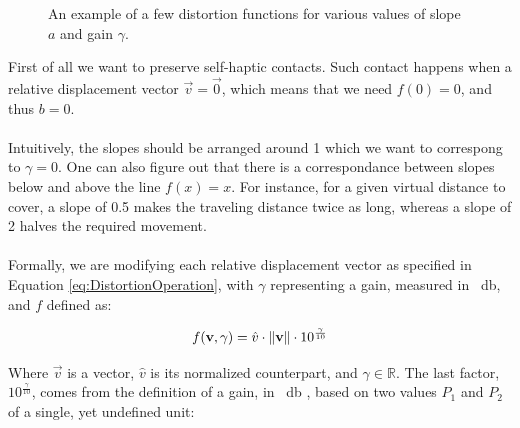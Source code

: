 \begin{figure}[h]
    \caption{An example of a few distortion functions for various values of slope $a$ and gain $\gamma $.}\label{fig:plotsOfGamma}
\end{figure}

\noindent
First of all we want to preserve self-haptic contacts. Such contact happens when a relative displacement vector $\vec{v} = \vec{0}$, which means that we need $f(0) = 0$, and thus $b = 0$.
\\\\
Intuitively, the slopes should be arranged around 1 which we want to correspong to $\gamma = 0$. One can also figure out that there is a correspondance between slopes below and above the line $f(x) = x$. For instance, for a given virtual distance to cover, a slope of \num{0.5} makes the traveling distance twice as long, whereas a slope of \num{2} halves the required movement.
\\\\
Formally, we are modifying each relative displacement vector as specified in Equation \ref{eq:DistortionOperation}, with $\gamma$ representing a gain, measured in \SI{}{\decibel}, and $f$ defined as:

\begin{equation}
\label{eq:DistortionFunction}
f(\mathbf{v},\gamma ) = \hat{v} \cdot \lVert\mathbf{v}\rVert \cdot 10^{\frac{\gamma}{10}}
\end{equation}

\noindent
Where $\vec{v}$ is a vector, $\hat{v}$ is its normalized counterpart, and $\gamma \in \mathbb{R}$. The last factor, $10^{\frac{\gamma}{10}}$, comes from the definition of a gain, in \SI{}{\decibel} \cite{book:decibel}, based on two values $P_1$ and $P_2$ of a single, yet undefined unit:

